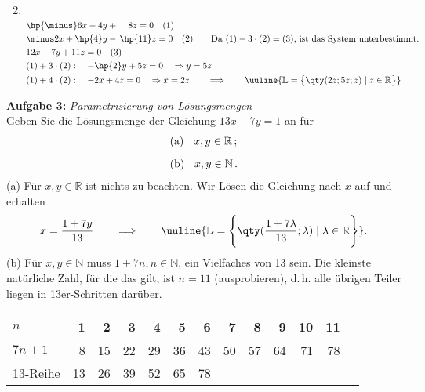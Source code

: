 \begin{enumerate}[label=(\alph*)]
\begin{align}
    \end{align}
    \newpage
    \item $~$\\[-1.45cm] 
    \begin{align}
        &\hp{\minus}6x-4y+\;\;\;\;8z=0\quad (1) \\
        &\minus2x+\hp{4}y-\,\hp{11}z=0\quad (2) \qquad \text{Da $(1)-3\cdot(2)=(3)$, ist das System unterbestimmt.}\\
        &12x-7y+11z=0\quad(3)\\
        &(1)+3\cdot(2): \quad -\hp{2}y+5z = 0 \quad \Rightarrow y=5z \\
        &(1)+4\cdot(2): \quad -2x+4z=0 \quad \Rightarrow x=2z \qquad \Longrightarrow \qquad \uuline{\mathbb{L} = \big\{\qty(2z;5z;z)\mid z\in\mathbb{R}\big\}
        }
    \end{align}
\end{enumerate}

% 
\textbf{Aufgabe 3: } \emph{Parametrisierung von Lösungsmengen}\\[0.2cm]
Geben Sie die Lösungsmenge der Gleichung $13x-7y=1$ an für
\begin{align}
&\text{(a) } \hspace{0.2cm} x,y\in\mathbb{R}\,;\\[0.2cm]
&\text{(b) } \hspace{0.2cm} x,y\in\mathbb{N}\,.
\end{align}
(a) Für $x,y \in \mathbb{R}$ ist nichts zu beachten. Wir Lösen die Gleichung nach $x$ auf und erhalten 
\begin{align}
    x = \frac{1+7y}{13} \qquad \Longrightarrow \qquad \uuline{\mathbb{L} = \Bigg\{\qty(\frac{1+7\lambda}{13};\lambda)\mid \lambda \in\mathbb{R}\Bigg\}}.
\end{align}
(b) Für $x,y \in \mathbb{N}$ muss $1+7n, n\in\mathbb{N}$, ein Vielfaches von 13 sein. Die kleinste natürliche Zahl, für die das gilt, ist $n=11$ (ausprobieren), d.\,h. alle übrigen Teiler liegen in 13er-Schritten darüber.
\begin{table}[htp]
    \centering
    \begin{tabular}{l r r r r r r r r r r r r}
        \toprule 
        $n$ & 1 & 2 & 3 & 4 & 5 & 6 & 7 & 8 & 9 & 10 & 11\\
        \midrule
        $7n+1$ & 8 & 15 & 22 & 29 & 36 & 43 & 50 & 57 & 64 & 71 & 78 \\
        13-Reihe & 13 & 26 & 39 & 52 & 65 & 78 
    \end{tabular}
\end{table}

